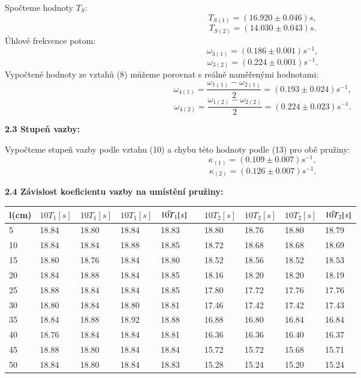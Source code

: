 \documentclass[a4paper]{article}
\begin{document}
\par Spočteme hodnoty $T_S$:
$$T_{S(1)} = (16.920 \pm 0.046)s,$$
$$T_{S(2)} = (14.030 \pm 0.043)s.$$
Úhlové frekvence potom:
$$\omega_{3(1)} = (0.186 \pm 0.001) s^{-1},$$
$$\omega_{3(2)} = (0.224 \pm 0.001) s^{-1}.$$
Vypočtené hodnoty ze vztahů (8) můžeme porovnat s reálně naměřenými hodnotami:
$$\omega_{4(1)} = \frac{\omega_{1(1)}-\omega_{2(1)}}{2} =  (0.193 \pm 0.024) s^{-1},$$
$$\omega_{4(2)} = \frac{\omega_{1(2)}-\omega_{2(2)}}{2} = (0.224 \pm 0.023) s^{-1}.$$
\par
\textbf{2.3 Stupeň vazby:}
\par Vypočteme stupeň vazby podle vztahu (10) a chybu této hodnoty podle (13) pro obě pružiny:
$$\kappa_{(1)} = (0.109 \pm 0.007) s^{-1},$$
$$\kappa_{(2)} = (0.126 \pm 0.007) s^{-1}.$$
\par
\textbf{2.4 Závislost koeficientu vazby na umístění pružiny:}
\par 
\begin{center}
     \label{tab:title} 
    \begin{tabular}{ | l | l | l | l | l | l | l |l |l |l |}
    \hline
     l(cm) & $10T_1[s]$ & $10T_1[s]$ & $10T_1[s]$ & $\Bar{10T_1}[s]$ &&$10T_2[s]$ & $10T_2[s]$ & $10T_2[s]$  &$\Bar{10T_2}[s]$ \\ \hline
     \hline
    5& 18.84 & 18.80 & 18.84 & 18.83 &&18.80 & 18.76 & 18.80 & 18.79\\ \hline
    10 & 18.84 & 18.84 & 18.88 & 18.85 &&18.72 & 18.68 & 18.68 & 18.69\\ \hline
    15& 18.80 & 18.76 & 18.84 & 18.80 &&18.52 & 18.56 & 18.52 &  18.53\\ \hline
    20 & 18.84 & 18.88 & 18.84 & 18.85 &&18.16 & 18.20 & 18.20 & 18.19  \\ \hline
    25 & 18.88 & 18.84 & 18.84 & 18.85 &&17.80 & 17.72 & 17.76 & 17.76\\ \hline
    30 & 18.80 & 18.84 & 18.80 & 18.81 &&17.46 &  17.42 & 17.42 & 17.43 \\ \hline
    35 & 18.84 & 18.88 & 18.92 & 18.88 &&16.88 & 16.80 & 16.84 &  16.84 \\ \hline
    40 & 18.76 & 18.84 & 18.84 & 18.81 &&16.36 & 16.36 & 16.40 & 16.37 \\ \hline
    45 & 18.88 & 18.80 & 18.84 & 18.84 &&15.72 & 15.72 & 15.68 & 15.71 \\ \hline
    50 & 18.84 & 18.80 & 18.84 & 18.83 &&15.28 & 15.24 & 15.20 & 15.24\\ \hline
    \end{tabular}
\newpage
\end{center}
\end{document}
